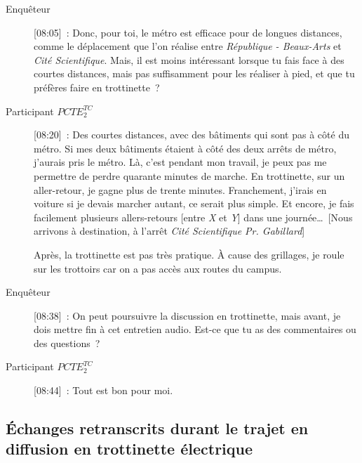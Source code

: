 \begin{description}
    \item[Enquêteur] [08:05]~: Donc, pour toi, le métro est efficace pour de longues distances, comme le déplacement que l'on réalise entre \textsl{République - Beaux-Arts} et \textsl{Cité Scientifique}. Mais, il est moins intéressant lorsque tu fais face à des courtes distances, mais pas suffisamment pour les réaliser à pied, et que tu préfères faire en trottinette~?
    \item[Participant \(PCTE^{TC}_{2}\)] [08:20]~: Des courtes distances, avec des bâtiments qui sont pas à côté du métro. Si mes deux bâtiments étaient à côté des deux arrêts de métro, j'aurais pris le métro. Là, c'est pendant mon travail, je peux pas me permettre de perdre quarante minutes de marche. En trottinette, sur un aller-retour, je gagne plus de trente minutes. Franchement, j'irais en voiture si je devais marcher autant, ce serait plus simple. Et encore, je fais facilement plusieurs allers-retours [entre \textsl{X} et \textsl{Y}] dans une journée\dots~[Nous arrivons à destination, à l'arrêt \textsl{Cité Scientifique Pr. Gabillard}]%

    Après, la trottinette est pas très pratique. À cause des grillages, je roule sur les trottoirs car on a pas accès aux routes du campus.
    \item[Enquêteur] [08:38]~: On peut poursuivre la discussion en trottinette, mais avant, je dois mettre fin à cet entretien audio. Est-ce que tu as des commentaires ou des questions~?
    \item[Participant \(PCTE^{TC}_{2}\)] [08:44]~: Tout est bon pour moi.%
\end{description}

\subsection{Échanges retranscrits durant le trajet en diffusion en trottinette électrique}

